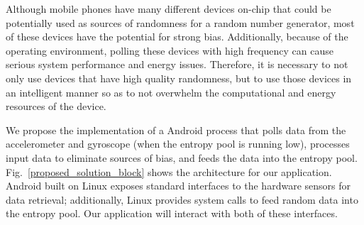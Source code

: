 \documentclass[conference]{IEEEtran}
\begin{document}
Although mobile phones have many different devices on-chip that could be potentially used as sources of randomness for a random number generator,
most of these devices have the potential for strong bias.  Additionally, because of the operating environment, polling these devices with high
frequency can cause serious system performance and energy issues.  Therefore, it is necessary to not only use devices that have high quality randomness,
but to use those devices in an intelligent manner so as to not overwhelm the computational and energy resources of the device.

We propose the implementation of a Android process that polls data from the accelerometer and gyroscope (when the entropy pool is running low), processes
input data to eliminate sources of bias, and feeds the data into the entropy pool.  Fig.~\ref{proposed_solution_block} shows the architecture for
our application. Android built on Linux exposes standard interfaces to the hardware sensors for data retrieval; additionally, Linux provides system calls
to feed random data into the entropy pool.  Our application will interact with both of these interfaces.

%
\end{document}
